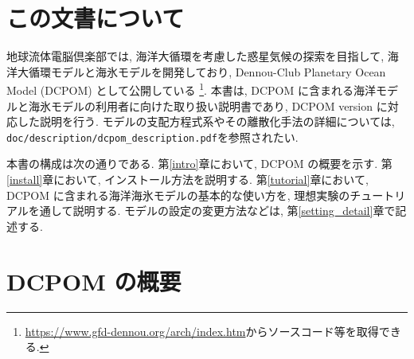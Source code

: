 \section{この文書について}
地球流体電脳倶楽部では, 海洋大循環を考慮した惑星気候の探索を目指して, 
海洋大循環モデルと海氷モデルを開発しており, 
Dennou-Club Planetary Ocean Model (DCPOM) として公開している%
\footnote{
\url{https://www.gfd-dennou.org/arch/index.htm}からソースコード等を取得できる. 
}. 
本書は, DCPOM に含まれる海洋モデルと海氷モデルの利用者に向けた取り扱い説明書であり, 
DCPOM version \version \; に対応した説明を行う. 
モデルの支配方程式系やその離散化手法の詳細については, 
\verb|doc/description/dcpom_description.pdf|を参照されたい.  

本書の構成は次の通りである. 
第\ref{intro}章において, DCPOM の概要を示す. 
第\ref{install}章において, インストール方法を説明する. 
第\ref{tutorial}章において, DCPOM に含まれる海洋海氷モデルの基本的な使い方を, 
理想実験のチュートリアルを通して説明する. 
モデルの設定の変更方法などは, 第\ref{setting_detail}章で記述する. 


\section{DCPOM の概要}

